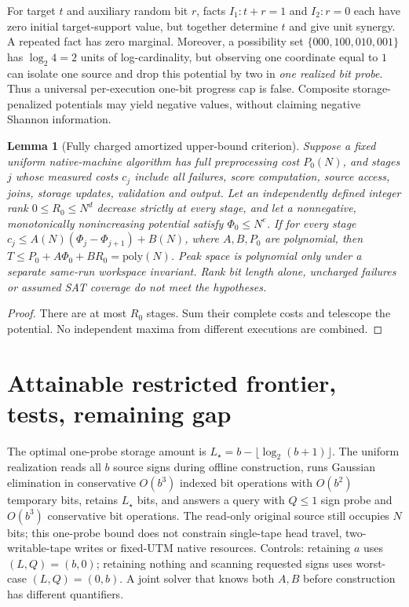 \documentclass[10pt]{article}
\newtheorem{lemma}[theorem]{Lemma}
\begin{document}
For target $t$ and auxiliary random bit $r$, facts
$I_1:t+r=1$ and $I_2:r=0$ each have zero initial target-support
value, but together determine $t$ and give unit synergy.
A repeated fact has zero marginal. Moreover, a possibility set
$\{000,100,010,001\}$ has $\log_2 4=2$ units of log-cardinality,
but observing one coordinate equal to $1$ can isolate one source
and drop this potential by two in \emph{one realized bit probe}.
Thus a universal per-execution one-bit progress cap is false.
Composite storage-penalized potentials may yield negative values,
without claiming negative Shannon information.

\begin{lemma}[Fully charged amortized upper-bound criterion]
Suppose a fixed uniform native-machine algorithm has full preprocessing
cost $P_0(N)$, and stages $j$ whose measured costs $c_j$ include
all failures, score computation, source access, joins, storage updates,
validation and output. Let an independently defined integer rank
$0\le R_0\le N^d$ decrease strictly at every stage, and let a
nonnegative, monotonically nonincreasing potential satisfy
$\Phi_0\le N^e$. If for every stage
$c_j\le A(N)(\Phi_j-\Phi_{j+1})+B(N)$,
where $A,B,P_0$ are polynomial, then
$T\le P_0+A\Phi_0+B R_0=\mathrm{poly}(N)$.
Peak space is polynomial only under a separate same-run workspace
invariant. Rank bit length alone, uncharged failures or assumed
SAT coverage do not meet the hypotheses.
\end{lemma}
\begin{proof}
There are at most $R_0$ stages. Sum their complete costs and
telescope the potential. No independent maxima from different
executions are combined.
\end{proof}

\section{Attainable restricted frontier, tests, remaining gap}
The optimal one-probe storage amount is
$L_\star=b-\lfloor\log_2(b+1)\rfloor$.
The uniform realization reads all $b$ source signs during offline
construction, runs Gaussian elimination in conservative $O(b^3)$
indexed bit operations with $O(b^2)$ temporary bits,
retains $L_\star$ bits, and answers a query with $Q\le1$
sign probe and $O(b^3)$ conservative bit operations.
The read-only original source still occupies $N$ bits; this
one-probe bound does not constrain single-tape head travel,
two-writable-tape writes or fixed-UTM native resources.
Controls: retaining $a$ uses $(L,Q)=(b,0)$;
retaining nothing and scanning requested signs uses worst-case
$(L,Q)=(0,b)$.
A joint solver that knows both $A,B$ before construction has
different quantifiers.
\end{document}
